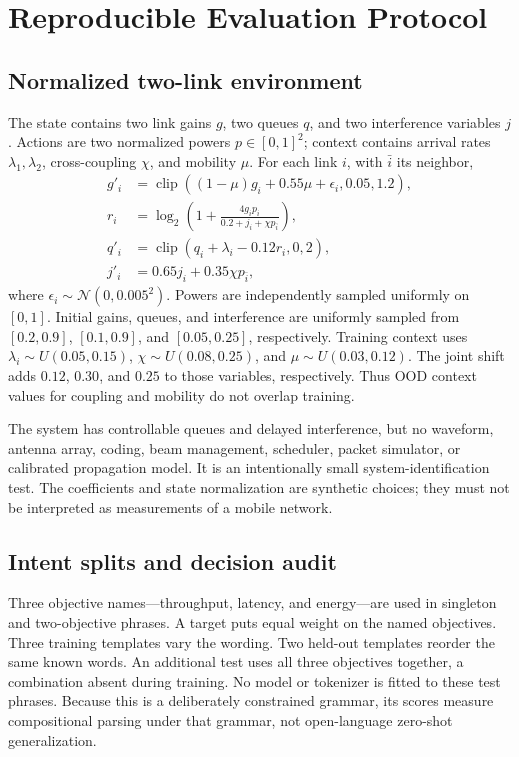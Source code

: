 \documentclass[10pt,twocolumn]{article}
\begin{document}
\section{Reproducible Evaluation Protocol}
\label{sec:protocol}
\subsection{Normalized two-link environment}
The state contains two link gains $g$, two queues $q$, and two interference
variables $j$. Actions are two normalized powers $p\in[0,1]^2$; context contains
arrival rates $\lambda_1,\lambda_2$, cross-coupling $\chi$, and mobility $\mu$.
For each link $i$, with $\bar i$ its neighbor,
\begin{align}
 g'_{i}&=\operatorname{clip}((1-\mu)g_i+0.55\mu+\epsilon_i,0.05,1.2),\\
 r_i&=\log_2\left(1+\frac{4g_ip_i}{0.2+j_i+\chi p_{\bar i}}\right),\\
 q'_i&=\operatorname{clip}(q_i+\lambda_i-0.12r_i,0,2),\\
 j'_i&=0.65j_i+0.35\chi p_{\bar i},
\end{align}
where $\epsilon_i\sim\mathcal N(0,0.005^2)$. Powers are independently sampled
uniformly on $[0,1]$. Initial gains, queues, and interference are uniformly
sampled from $[0.2,0.9]$, $[0.1,0.9]$, and $[0.05,0.25]$, respectively.
Training context uses $\lambda_i\sim U(0.05,0.15)$,
$\chi\sim U(0.08,0.25)$, and $\mu\sim U(0.03,0.12)$.
The joint shift adds $0.12$, $0.30$, and $0.25$ to those variables, respectively.
Thus OOD context values for coupling and mobility do not overlap training.

The system has controllable queues and delayed interference, but no waveform,
antenna array, coding, beam management, scheduler, packet simulator, or calibrated
propagation model. It is an intentionally small system-identification test.
The coefficients and state normalization are synthetic choices; they must not
be interpreted as measurements of a mobile network.

\subsection{Intent splits and decision audit}
Three objective names---throughput, latency, and energy---are used in singleton
and two-objective phrases. A target puts equal weight on the named objectives.
Three training templates vary the wording. Two held-out templates reorder the
same known words. An additional test uses all three objectives together, a
combination absent during training. No model or tokenizer is fitted to these
test phrases. Because this is a deliberately constrained grammar, its scores
measure compositional parsing under that grammar, not open-language zero-shot
generalization.
\end{document}
